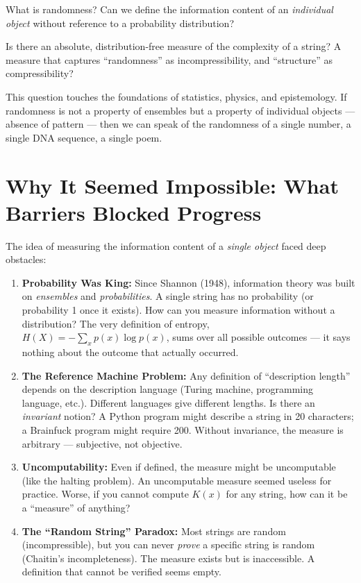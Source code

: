 What is randomness? Can we define the information content of an \emph{individual object} without reference to a probability distribution?

Is there an absolute, distribution-free measure of the complexity of a string? A measure that captures ``randomness'' as incompressibility, and ``structure'' as compressibility?

This question touches the foundations of statistics, physics, and epistemology. If randomness is not a property of ensembles but a property of individual objects --- absence of pattern --- then we can speak of the randomness of a single number, a single DNA sequence, a single poem.

\section{Why It Seemed Impossible: What Barriers Blocked Progress}
\label{sec:kolmogorov:impossible}

The idea of measuring the information content of a \emph{single object} faced deep obstacles:

\begin{enumerate}
\item \textbf{Probability Was King:} Since Shannon (1948), information theory was built on \emph{ensembles} and \emph{probabilities}. A single string has no probability (or probability 1 once it exists). How can you measure information without a distribution? The very definition of entropy, $H(X) = -\sum_x p(x)\log p(x)$, sums over all possible outcomes --- it says nothing about the outcome that actually occurred.

\item \textbf{The Reference Machine Problem:} Any definition of ``description length'' depends on the description language (Turing machine, programming language, etc.). Different languages give different lengths. Is there an \emph{invariant} notion? A Python program might describe a string in 20 characters; a Brainfuck program might require 200. Without invariance, the measure is arbitrary --- subjective, not objective.

\item \textbf{Uncomputability:} Even if defined, the measure might be uncomputable (like the halting problem). An uncomputable measure seemed useless for practice. Worse, if you cannot compute $K(x)$ for any string, how can it be a ``measure'' of anything?

\item \textbf{The ``Random String'' Paradox:} Most strings are random (incompressible), but you can never \emph{prove} a specific string is random (Chaitin's incompleteness). The measure exists but is inaccessible. A definition that cannot be verified seems empty.
\end{enumerate}

